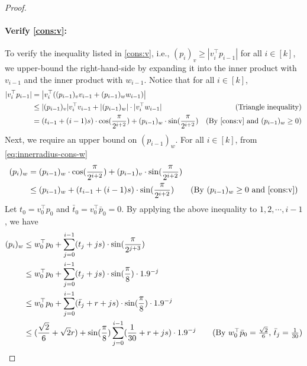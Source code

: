 \documentclass{theoretics}
\begin{document}
\begin{proof}
    \paragraph{Verify \eqref{cons:v}:}
    To verify the inequality listed in \eqref{cons:v}, i.e.,
    $(p_i)_v \geq |v_i^\top p_{i-1}|$ for all $i \in [k]$, we upper-bound the right-hand-side by expanding it into the inner product with $v_{i-1}$ and the inner product with $w_{i-1}$.
    Notice that for all $i \in [k]$,
    \begin{align}\label{eq:innerradius-cond-v}
        |v_i^\top p_{i-1}| &= \left|v_i^\top ((p_{i-1})_v v_{i-1} + (p_{i-1})_w w_{i-1}) \right| \nonumber \\
        &\leq |(p_{i-1})_v| v_i^\top v_{i-1} + |(p_{i-1})_w| \cdot |v_i^\top w_{i-1}| & \text{(Triangle inequality)} \nonumber \\
        &= (t_{i-1} + (i-1)s) \cdot \cos(\frac{\pi}{2^{i + 2}}) + (p_{i-1})_w \cdot \sin(\frac{\pi}{2^{i+2}}) & \text{(By \eqref{cons:v} and $(p_{i-1})_w \geq 0$)} 
    \end{align}
    Next, we require an upper bound on $(p_{i-1})_w$. For all $i\in [k]$, from \eqref{eq:innerradius-cons-w}
    \begin{align*}
        (p_i)_w &= (p_{i-1})_w \cdot \cos(\frac{\pi}{2^{i+2}}) + (p_{i-1})_v \cdot \sin(\frac{\pi}{2^{i+2}}) \\
        &\leq (p_{i-1})_w + (t_{i-1} + (i-1)s) \cdot \sin(\frac{\pi}{2^{i+2}}) \tag{By $(p_{i-1})_w \geq 0$ and \eqref{cons:v}} 
    \end{align*}
    Let $t_0 = v_0^\top p_0$ and $\bar{t}_0 = v_0^\top \bar{p}_0 = 0$.
    By applying the above inequality to $1, 2, \cdots, i-1$,
    we have
    \begin{align}
        (p_{i})_w &\leq w_0^\top p_0 + \sum_{j=0}^{i-1} (t_j + js) \cdot \sin(\frac{\pi}{2^{j+3}}) \nonumber \\
        &\leq w_0^\top p_0 + \sum_{j=0}^{i-1} (t_j + js) \cdot \sin(\frac{\pi}{8}) \cdot 1.9^{-j}  \nonumber \\
        &\leq w_0^\top p_0 + \sum_{j=0}^{i-1} (\bar{t}_j + r + js) \cdot \sin(\frac{\pi}{8}) \cdot 1.9^{-j} \nonumber \\
        &\leq (\frac{\sqrt{2}}{6} + \sqrt{2} r) + \sin(\frac{\pi}{8}) \sum_{j=0}^{i-1}  (\frac{1}{30} + r + js) \cdot 1.9^{-j} \tag{By $w_0^\top \bar{p}_0 = \frac{\sqrt{2}}{6}$, $\bar{t}_j = \frac{1}{30}$} \nonumber \\

\end{align}
\end{proof}
\end{document}
